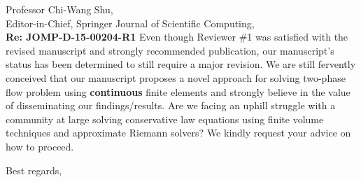 \documentclass[11pt]{letter}
\begin{document}
\begin{letter}{Professor Chi-Wang Shu, \\  Editor-in-Chief, Springer Journal of Scientific Computing,\\
\textbf{Re: JOMP-D-15-00204-R1}}
\bigskip
Even though Reviewer \#1 was
satisfied with the revised manuscript and strongly recommended publication, our manuscript's status has been 
determined to still require a major revision. We are still fervently
conceived that our manuscript proposes a novel approach for solving two-phase flow problem using {\bf continuous}
finite elements and strongly believe in the value of disseminating our findings/results. Are we facing an uphill
struggle with a community at large solving conservative law equations using finite volume techniques and
approximate Riemann solvers?
We kindly request your advice on how to proceed. 



\closing{Best regards, }

\end{letter}
\end{document}
